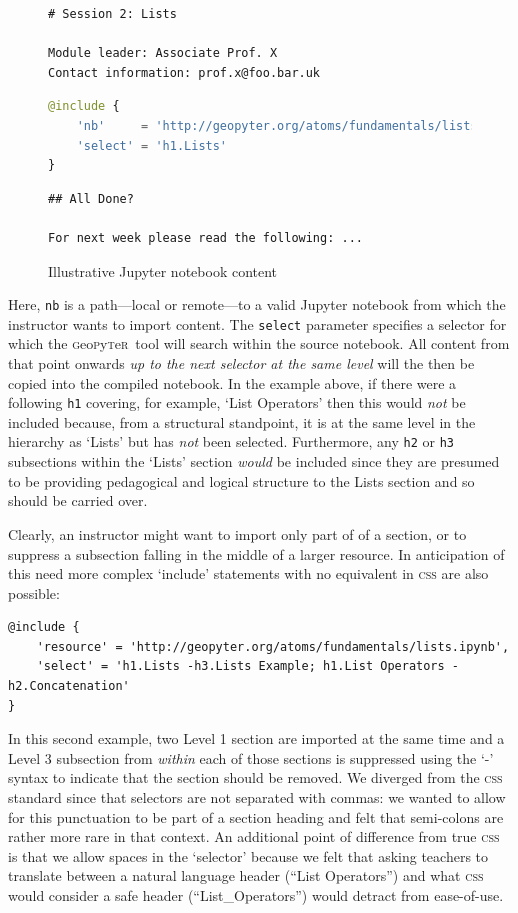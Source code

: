 \documentclass[letter, 11pt,titlepage]{article}
\newcommand{\gp}{\textsc{g}eo\textsc{p}y\textsc{t}e\textsc{r}~\/}
\begin{document}
\begin{figure}
	\centering 
	\caption{Illustrative Jupyter notebook content}
	\label{fig:include}
\begin{lstlisting}[language=HTML,frame=single]
# Session 2: Lists

Module leader: Associate Prof. X
Contact information: prof.x@foo.bar.uk
\end{lstlisting}	
\begin{lstlisting}[language=Python,frame=single]
@include {
    'nb'     = 'http://geopyter.org/atoms/fundamentals/lists.ipynb',
    'select' = 'h1.Lists'
}
\end{lstlisting}

\begin{lstlisting}[language=HTML,frame=single]
## All Done?

For next week please read the following: ...
\end{lstlisting}

\end{figure}

Here, \texttt{nb} is a path---local or remote---to a valid Jupyter notebook from which the instructor wants to import content. The \texttt{select} parameter specifies a selector for which the \gp tool will search within the source notebook. All content from that point onwards \emph{up to the next selector at the same level} will the then be copied into the compiled notebook. In the example above, if there were a following \texttt{h1} covering, for example, `List Operators' then this would \emph{not} be included because, from a structural standpoint, it is at the same level in the hierarchy as `Lists' but has \emph{not} been selected. Furthermore, any \texttt{h2} or \texttt{h3} subsections within the `Lists' section \emph{would} be included since they are presumed to be providing pedagogical and logical structure to the Lists section and so should be carried over.

Clearly, an instructor might want to import only part of of a section, or to suppress a subsection falling in the middle of a larger resource. In anticipation of this need more complex `include' statements with no equivalent in \textsc{css} are also possible:
\begin{Verbatim}[fontsize=\small]
@include {
    'resource' = 'http://geopyter.org/atoms/fundamentals/lists.ipynb',
    'select' = 'h1.Lists -h3.Lists Example; h1.List Operators -h2.Concatenation'
}
\end{Verbatim}
In this second example, two Level 1 section are imported at the same time and a Level 3 subsection from \emph{within} each of those sections is suppressed using the `-' syntax to indicate that the section should be removed. We diverged from the \textsc{css} standard since that selectors are not separated with commas: we wanted to allow for this punctuation to be part of a section heading and felt that semi-colons are rather more rare in that context. An additional point of difference from true \textsc{css} is that we allow spaces in the `selector' because we felt that asking teachers to translate between a natural language header (``List Operators'') and what \textsc{css} would consider a safe header (``List\_Operators'') would detract from ease-of-use.
\end{document}
